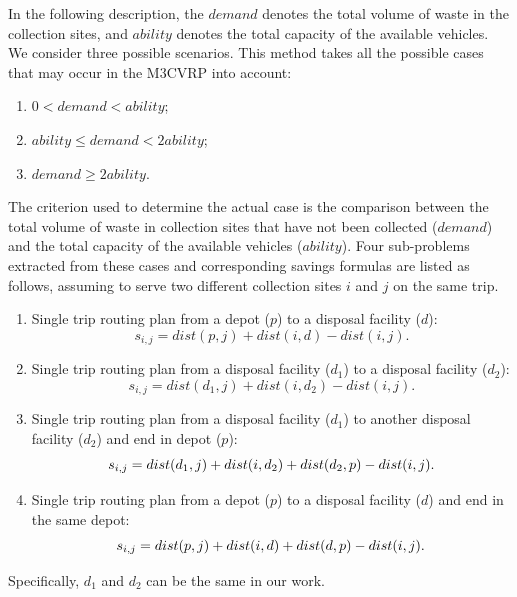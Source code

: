 \documentclass[journal]{IEEEtran}
\begin{document}
In the following description, the $demand$ denotes the total volume of waste in the collection sites, and $ability$ denotes the total capacity of the available vehicles.
We consider three possible scenarios. This method takes all the possible cases that may occur in the M3CVRP into account:
\begin{enumerate}[leftmargin=*,label=(\roman*)]
	\item $0 < demand < ability$;
	\item $ability \leq demand < 2ability$;
	\item $demand \geq 2ability$.
\end{enumerate}
The criterion used to determine the actual case is the comparison between the total volume of waste in collection sites that have not been collected ($demand$) and the total capacity of the available vehicles ($ability$). Four sub-problems extracted from these cases and corresponding savings formulas are listed as follows, assuming to serve two different collection sites $i$ and $j$ on the same trip.
\begin{enumerate}[label=$\mathcal{P}_\arabic*$]
	\item \label{first} Single trip routing plan from a depot ($p$) to a disposal facility ($d$):
	\begin{equation}\label{eq:save1}
	    s_{i,j}=dist(p,j)+dist(i,d)-dist(i,j).
	\end{equation}
	\item \label{second} Single trip routing plan from a disposal facility ($d_1$) to a disposal facility ($d_2$):
	\begin{equation}\label{eq:save2}
	    s_{i,j}=dist(d_1, j)+dist(i,d_2)-dist(i,j).
	\end{equation}
	\item \label{third} Single trip routing plan from a disposal facility ($d_1$) to another disposal facility ($d_2$) and end in depot ($p$):
	\begin{equation}\label{eq:save3}
	  \hspace{-8pt}  s_{i,j}=dist(d_1,j)+dist(i,d_2)+dist(d_2,p)-dist(i,j).\hspace{-8pt} 
	\end{equation}
	\item \label{forth} Single trip routing plan from a depot ($p$) to a disposal facility ($d$) and end in the same depot:
	\begin{equation}\label{eq:save4}
	   \hspace{-5pt}  s_{i,j}=dist(p,j)+dist(i,d)+dist(d,p)-dist(i,j).\hspace{-3pt} 
	\end{equation}
\end{enumerate}
Specifically, $d_1$ and $d_2$ can be the same in our work.
\end{document}

